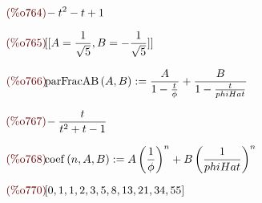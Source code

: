 \begin{math}\displaystyle
\parbox{8ex}{\color{labelcolor}(\%o764) }
-{t}^{2}-t+1
\end{math}

\begin{math}\displaystyle
\parbox{8ex}{\color{labelcolor}(\%o765) }
[[A=\frac{1}{\sqrt{5}},B=-\frac{1}{\sqrt{5}}]]
\end{math}

\begin{math}\displaystyle
\parbox{8ex}{\color{labelcolor}(\%o766) }
\mathrm{parFracAB}\left( A,B\right)
:=\frac{A}{1-\frac{t}{\phi}}+\frac{B}{1-\frac{t}{phiHat}}
\end{math}

\begin{math}\displaystyle
\parbox{8ex}{\color{labelcolor}(\%o767) }
-\frac{t}{{t}^{2}+t-1}
\end{math}

\begin{math}\displaystyle
\parbox{8ex}{\color{labelcolor}(\%o768) }
\mathrm{coef}\left( n,A,B\right) :=A\,{\left( \frac{1}{\phi}\right)
}^{n}+B\,{\left( \frac{1}{phiHat}\right) }^{n}
\end{math}

\begin{math}\displaystyle
\parbox{8ex}{\color{labelcolor}(\%o770) }
[0,1,1,2,3,5,8,13,21,34,55]
\end{math}



